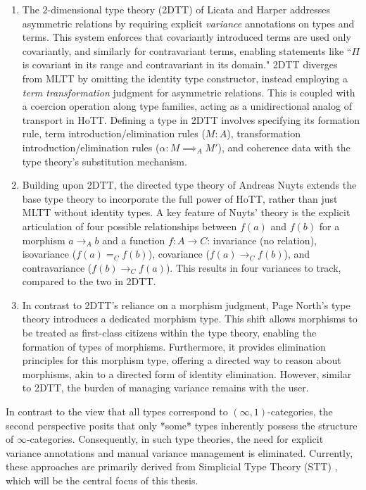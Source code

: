 \documentclass[main.tex]{subfiles}
\begin{document}
\begin{enumerate}
	\item The $2$-dimensional type theory (2DTT) of Licata and Harper \cite{daniel_r_licata_2-dimensional_2011} addresses asymmetric relations by requiring explicit \textit{variance} annotations on types and terms. This system enforces that covariantly introduced terms are used only covariantly, and similarly for contravariant terms, enabling statements like ``$\Pi$ is covariant in its range and contravariant in its domain."  2DTT diverges from MLTT by omitting the identity type constructor, instead employing a \textit{term transformation} judgment for asymmetric relations. This is coupled with a coercion operation along type families, acting as a unidirectional analog of transport in HoTT. Defining a type in 2DTT involves specifying its formation rule, term introduction/elimination rules ($M:A$), transformation introduction/elimination rules ($\alpha : M \implies_A M'$), and coherence data with the type theory's substitution mechanism.
	\item Building upon 2DTT, the directed type theory of Andreas Nuyts \cite{nuyts2015towards} extends the base type theory to incorporate the full power of HoTT, rather than just MLTT without identity types. A key feature of Nuyts' theory is the explicit articulation of four possible relationships between $f(a)$ and $f(b)$ for a morphism $a \to_A b$ and a function $f : A \to C$: invariance (no relation), isovariance ($f(a) =_C f(b)$), covariance ($f(a) \to_C f(b)$), and contravariance ($f(b) \to_C f(a)$). This results in four variances to track, compared to the two in 2DTT.
	\item In contrast to 2DTT's reliance on a morphism judgment, Page North's type theory \cite{north_towards_2019} introduces a dedicated morphism type. This shift allows morphisms to be treated as first-class citizens within the type theory, enabling the formation of types of morphisms. Furthermore, it provides elimination principles for this morphism type, offering a directed way to reason about morphisms, akin to a directed form of identity elimination. However, similar to 2DTT, the burden of managing variance remains with the user.
  \end{enumerate}

In contrast to the view that all types correspond to $(\infty,1)$-categories, the second perspective posits that only *some* types inherently possess the structure of $\infty$-categories. Consequently, in such type theories, the need for explicit variance annotations and manual variance management is eliminated. Currently, these approaches are primarily derived from Simplicial Type Theory (STT) \cite{riehl_type_2017}, which will be the central focus of this thesis.
\end{document}
